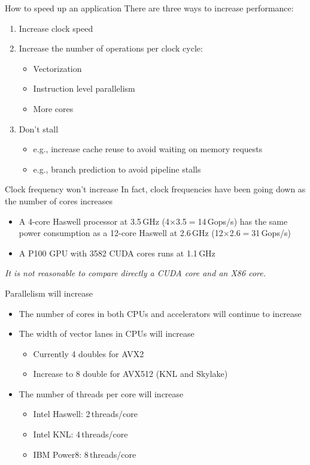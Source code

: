 \documentclass[aspectratio=169,12pt]{beamer}
\begin{document}
\begin{frame}{How to speed up an application}
  There are three ways to increase performance:
  \vfill
  \begin{enumerate}
  \item Increase clock speed
  \item Increase the number of operations per clock cycle:
    \begin{itemize}
    \item Vectorization
    \item Instruction level parallelism
    \item More cores
    \end{itemize}
  \item Don't stall
    \begin{itemize}
    \item e.g., increase cache reuse to avoid waiting on memory requests
    \item e.g., branch prediction to avoid pipeline stalls
    \end{itemize}
  \end{enumerate}
\end{frame}

\begin{frame}{Clock frequency won't increase}
  In fact, clock frequencies have been going down as the number of cores increases
  \begin{itemize}
  \item A 4-core Haswell processor at 3.5\,GHz (4$\times$3.5$=$14\,Gops/s) has the same power consumption as a 12-core Haswell at 2.6\,GHz (12$\times$2.6$=$31\,Gops/s)
  \item A P100 GPU with 3582 CUDA cores runs at 1.1\,GHz
  \end{itemize}
  \vfill
  \emph{It is not reasonable to compare directly a CUDA core and an X86 core.}
\end{frame}

\begin{frame}{Parallelism will increase}
  \begin{itemize}
  \item The number of cores in both CPUs and accelerators will continue to increase
  \item The width of vector lanes in CPUs will increase
    \begin{itemize}
    \item Currently 4 doubles for AVX2
    \item Increase to 8 double for AVX512 (KNL and Skylake)
    \end{itemize}
  \item The number of threads per core will increase
    \begin{itemize}
    \item Intel Haswell: 2\,threads/core
    \item Intel KNL: 4\,threads/core
    \item IBM Power8: 8\,threads/core
    \end{itemize}
  \end{itemize}
\end{frame}
\end{document}
